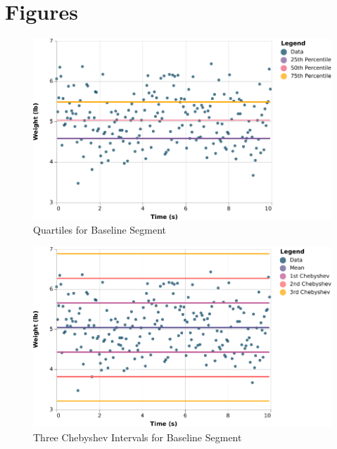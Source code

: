 \section{Figures}
\begin{figure}[ht]
    \centering
    \includegraphics{chart/00-intro/baseline-quartiles.pdf}
    \caption{Quartiles for Baseline Segment}
    \label{figure:00.baseline.quartiles}
\end{figure}
\begin{figure}[ht]
    \centering
    \includegraphics{chart/00-intro/baseline-chebyshev.pdf}
    \caption{Three Chebyshev Intervals for Baseline Segment}
    \label{figure:00.baseline.chebyshev}
\end{figure}
